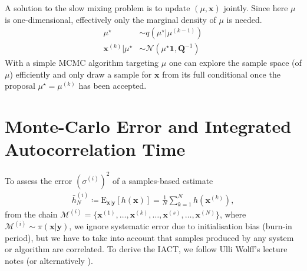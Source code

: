 A solution to the slow mixing problem is to update $(\mu, \bm{x})$ jointly.
Since here $\mu$ is one-dimensional, effectively only the marginal density of $\mu$ is needed.
\begin{align}
	\mu^{\star}  &\sim q (\mu^{\star}|	\mu^{(k-1)} ) \\
	\bm{x}^{(k)} | \mu^{\star} &\sim \mathcal{N} (	\mu^{\star}\bm{1}, \bm{Q}^{-1}) 
\end{align}
With a simple MCMC algorithm targeting $ \mu$ one can explore the sample space (of $ \mu$) efficiently and only draw a sample for $\bm{x}$ from its full conditional once the proposal $\mu^{\star} =\mu^{(k)} $ has been accepted.

\section{Monte-Carlo Error and Integrated Autocorrelation Time}
\label{ap:IATC}
To assess the error $(\sigma^{(i)})^2$ of a samples-based estimate 
\begin{align}
	\bar{h}_N^{(i)} \coloneqq	\text{E}_{\bm{x}|\bm{y}} [h(\bm{x})] = \frac{1}{N} \sum_{k=1}^{N} h(\bm{x}^{(k)}),
\end{align} 
from the chain $\mathcal{M}^{(i)} = \{\bm{x}^{(1)}, \dots,\bm{x}^{(k)},\dots, \bm{x}^{(s)},\dots, \bm{x}^{(N)}\}$, where $\mathcal{M}^{(i)} \sim \pi(\bm{x}|\bm{y})$, we ignore systematic error due to initialisation bias (burn-in period), but we have to take into account that samples produced by any system or algorithm are correlated.
To derive the IACT, we follow Ulli Wolff's lecture notes \cite{wolff2002LecNot} (or alternatively \cite{wolff2004monte}).

